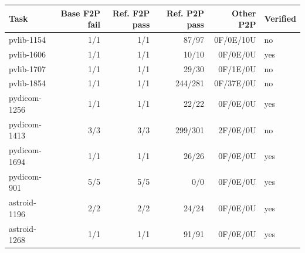 \begin{tabular}{lrrrrl}
\toprule
Task & Base F2P fail & Ref. F2P pass & Ref. P2P pass & Other P2P & Verified \\
\midrule
pvlib-1154 & 1/1 & 1/1 & 87/97 & 0F/0E/10U & no \\
pvlib-1606 & 1/1 & 1/1 & 10/10 & 0F/0E/0U & yes \\
pvlib-1707 & 1/1 & 1/1 & 29/30 & 0F/1E/0U & no \\
pvlib-1854 & 1/1 & 1/1 & 244/281 & 0F/37E/0U & no \\
pydicom-1256 & 1/1 & 1/1 & 22/22 & 0F/0E/0U & yes \\
pydicom-1413 & 3/3 & 3/3 & 299/301 & 2F/0E/0U & no \\
pydicom-1694 & 1/1 & 1/1 & 26/26 & 0F/0E/0U & yes \\
pydicom-901 & 5/5 & 5/5 & 0/0 & 0F/0E/0U & yes \\
astroid-1196 & 2/2 & 2/2 & 24/24 & 0F/0E/0U & yes \\
astroid-1268 & 1/1 & 1/1 & 91/91 & 0F/0E/0U & yes \\
\bottomrule
\end{tabular}
